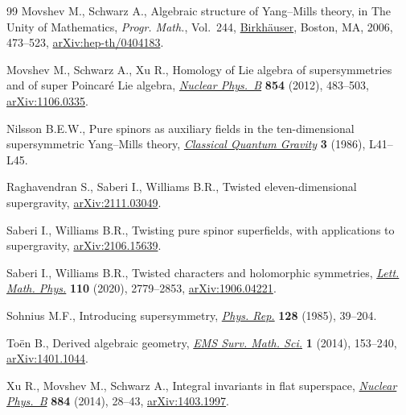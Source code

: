 \documentclass[10pt,a4paper]{amsart}
\numberwithin{equation}{section}
\begin{document}
\begin{thebibliography}{99}
Movshev M., Schwarz A., Algebraic structure of {Y}ang--{M}ills theory, in The
 Unity of Mathematics, \textit{Progr. Math.}, Vol.~244, \href{https://doi.org/10.1007/0-8176-4467-9_14}{Birkh\"auser},
 Boston, MA, 2006, 473--523, \href{https://arxiv.org/abs/hep-th/0404183}{arXiv:hep-th/0404183}.

Movshev M., Schwarz A., Xu R., Homology of {L}ie algebra of supersymmetries and
 of super {P}oincar\'e {L}ie algebra, \href{https://doi.org/10.1016/j.nuclphysb.2011.08.023}{\textit{Nuclear Phys.~B}} \textbf{854}
 (2012), 483--503, \href{https://arxiv.org/abs/1106.0335}{arXiv:1106.0335}.

Nilsson B.E.W., Pure spinors as auxiliary fields in the ten-dimensional
 supersymmetric {Y}ang--{M}ills theory, \href{https://doi.org/10.1088/0264-9381/3/2/007}{\textit{Classical Quantum Gravity}}
 \textbf{3} (1986), L41--L45.

Raghavendran S., Saberi I., Williams B.R., Twisted eleven-dimensional
 supergravity, \href{https://arxiv.org/abs/2111.03049}{arXiv:2111.03049}.

Saberi I., Williams B.R., Twisting pure spinor superfields, with applications
 to supergravity, \href{https://arxiv.org/abs/2106.15639}{arXiv:2106.15639}.

Saberi I., Williams B.R., Twisted characters and holomorphic symmetries,
 \href{https://doi.org/10.1007/s11005-020-01319-4}{\textit{Lett. Math. Phys.}} \textbf{110} (2020), 2779--2853,
 \href{https://arxiv.org/abs/1906.04221}{arXiv:1906.04221}.

Sohnius M.F., Introducing supersymmetry, \href{https://doi.org/10.1016/0370-1573(85)90023-7}{\textit{Phys. Rep.}} \textbf{128}
 (1985), 39--204.

To\"en B., Derived algebraic geometry, \href{https://doi.org/10.4171/EMSS/4}{\textit{EMS Surv. Math. Sci.}} \textbf{1}
 (2014), 153--240, \href{https://arxiv.org/abs/1401.1044}{arXiv:1401.1044}.

Xu R., Movshev M., Schwarz A., Integral invariants in flat superspace,
 \href{https://doi.org/10.1016/j.nuclphysb.2014.04.009}{\textit{Nuclear Phys.~B}} \textbf{884} (2014), 28--43, \href{https://arxiv.org/abs/1403.1997}{arXiv:1403.1997}.

\end{thebibliography}
\end{document}
